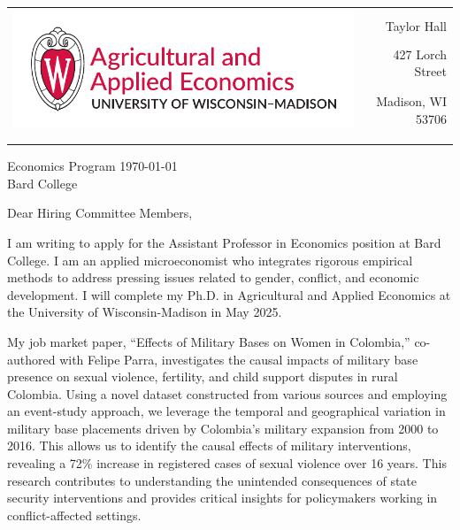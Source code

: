 \documentclass[12pt]{letter}
\begin{document}
\begin{tabularx}{\textwidth}{Xr}
\multirow{4}{*}{\includegraphics[height=3\baselineskip]{logo_cropped.pdf}} &  \\
& Taylor Hall \\
& 427 Lorch Street \\
& Madison, WI 53706 \\
[-1.8ex]\\
\\
\end{tabularx}

Economics Program \hfill \today \\
Bard College 

\medskip

Dear Hiring Committee Members,

I am writing to apply for the Assistant Professor in Economics position at Bard College. 
I am an applied microeconomist who integrates rigorous empirical methods to address pressing issues related to gender, conflict, and economic development.
I will complete my Ph.D. in Agricultural and Applied Economics at the University of Wisconsin-Madison in May 2025. 

My job market paper, “Effects of Military Bases on Women in Colombia,” co-authored with Felipe Parra, investigates the causal impacts of military base presence 
on sexual violence, fertility, and child support disputes in rural Colombia. Using a novel dataset constructed from various sources and employing an event-study approach, 
we leverage the temporal and geographical variation in military base placements driven by Colombia's military expansion from 2000 to 2016. This allows us to identify 
the causal effects of military interventions, revealing a 72\% increase in registered cases of sexual violence over 16 years. 
This research contributes to understanding the unintended consequences of state security interventions and provides critical insights 
for policymakers working in conflict-affected settings.
\end{document}
